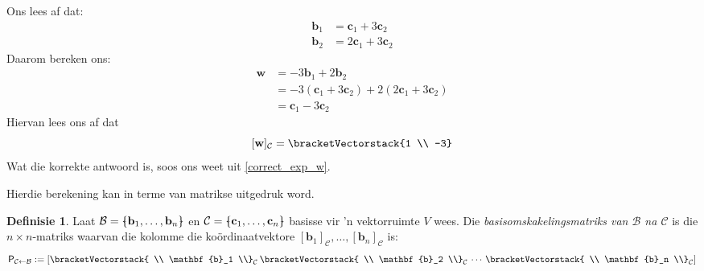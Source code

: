 \documentclass[a4paper,11pt]{book}
\theoremstyle{definition}
\newtheorem{definition}[theorem]{Definisie}
\newcommand{\be}{\begin{equation}}
\newcommand{\ee}{\end{equation}}
\newcommand{\ve}[1]{\mathbf{#1}}
\newcommand{\mat}[1]{\mathsf{#1}}
\newcommand{\basis}[1]{{\mathcal #1}}
\newcommand{\cvector}[1]{\bracketVectorstack{#1}}
\newcommand{\bmark}{\raisebox{.53ex}{\rule{.2em}{.1ex}}}
\newcommand{\bopen}{{\protect\ooalign{\{\cr\hfil\bmark\hfil\cr}}}
\newcommand{\bclose}{{\protect\ooalign{\}\cr\hfil\bmark\hfil\cr}}}
\begin{document}
Ons lees af dat:
\begin{align} \label{b_in_terms_of_c}
	\ve{b}_1 &= \ve{c}_1 + 3 \ve{c}_2 \\
	\ve{b}_2 &= 2 \ve{c}_1 + 3 \ve{c}_2 \label{b_in_terms_of_c_2} 
\end{align}
Daarom bereken ons: 
\begin{align*}
	\ve{w} &= -3 \ve{b}_1 + 2 \ve{b}_2 \\
	&= -3 (\ve{c}_1 + 3 \ve{c}_2) + 2(2 \ve{c}_1 + 3 \ve{c}_2) \\
	&= \ve{c}_1 - 3 \ve{c}_2
\end{align*}
Hiervan lees ons af dat
\be \label{w_in_basis_C}
	[\ve{w}]_\basis{C} = \cvector{1 \\ -3}
\ee
Wat die korrekte antwoord is, soos ons weet uit \eqref{correct_exp_w}. 

Hierdie berekening kan in terme van matrikse uitgedruk word.
\begin{definition} Laat $\basis{B} = \bopen \ve{b}_1, \ldots, \ve{b}_n
	\bclose$ en $\basis{C} = \bopen \ve{c}_1, \ldots, \ve{c}_n \bclose$
	basisse vir 'n vektorruimte $V$ wees. Die
	\emph{basisomskakelingsmatriks van $\basis{B}$ na $\basis{C}$} is die
	$n \times n$-matriks waarvan die kolomme die ko{\"o}rdinaatvektore
	$[\ve{b}_1]_\basis{C}, \ldots, [\ve{b}_n]_\basis{C}$ is:
	\[
		\mat{P}_{\basis{C} \leftarrow \basis{B}} := \left[ \cvector{ \\
		\ve{b}_1 \\}_\basis{C} \,  \cvector{ \\ \ve{b}_2 \\}_\basis{C} \,
		\cdots \, \cvector{ \\ \ve{b}_n \\}_\basis{C}\right]
	\]
\end{definition}
\end{document}
